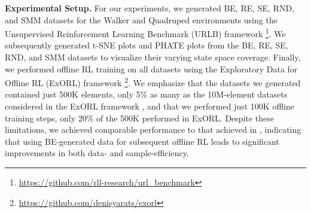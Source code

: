 \textbf{Experimental Setup.} For our experiments, we generated BE, RE, SE, RND, and SMM datasets for the Walker and Quadruped environments using the Unsupervised Reinforcement Learning Benchmark (URLB) framework \citep{laskin2021urlb}\footnote{\url{https://github.com/rll-research/url_benchmark}}. We subsequently generated t-SNE plots \citep{hinton2002stochastic} and PHATE plots \citep{moon2019visualizing} from the BE, RE, SE, RND, and SMM datasets to visualize their varying state space coverage. Finally, we performed offline RL training on all datasets using the Exploratory Data for Offline RL (ExORL) framework \citep{yarats2022don}\footnote{\url{https://github.com/denisyarats/exorl}}. We emphasize that the datasets we generated contained just 500K elements, only 5\% as many as the 10M-element datasets considered in the ExORL framework \citep{yarats2022don}, and that we performed just 100K offline training steps, only 20\% of the 500K performed in ExORL. Despite these limitations, we achieved comparable performance to that achieved in \citep{yarats2022don}, indicating that using BE-generated data for subsequent offline RL leads to significant improvements in both data- and sample-efficiency.




